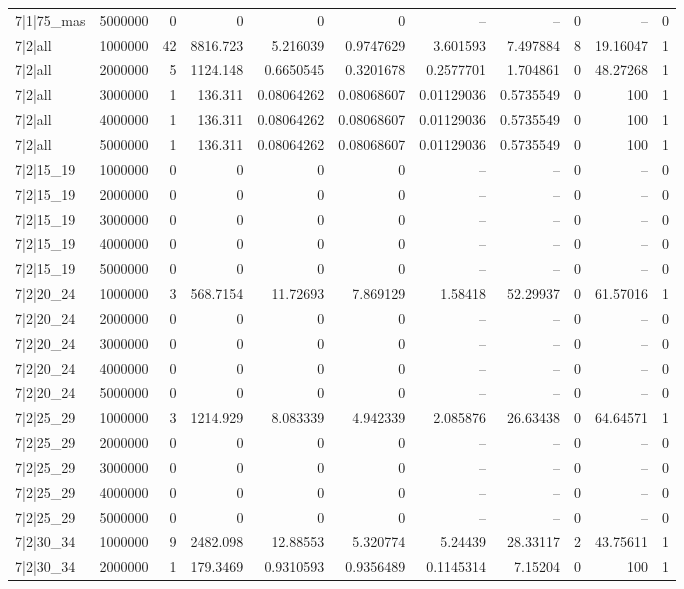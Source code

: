 \begin{tabular}{lrrrrrrrrrr}
7|1|75\_mas & 5000000 & 0 & 0 & 0 & 0 & -- & -- & 0 & -- & 0 \\
7|2|all & 1000000 & 42 & 8816.723 & 5.216039 & 0.9747629 & 3.601593 & 7.497884 & 8 & 19.16047 & 1 \\
7|2|all & 2000000 & 5 & 1124.148 & 0.6650545 & 0.3201678 & 0.2577701 & 1.704861 & 0 & 48.27268 & 1 \\
7|2|all & 3000000 & 1 & 136.311 & 0.08064262 & 0.08068607 & 0.01129036 & 0.5735549 & 0 & 100 & 1 \\
7|2|all & 4000000 & 1 & 136.311 & 0.08064262 & 0.08068607 & 0.01129036 & 0.5735549 & 0 & 100 & 1 \\
7|2|all & 5000000 & 1 & 136.311 & 0.08064262 & 0.08068607 & 0.01129036 & 0.5735549 & 0 & 100 & 1 \\
7|2|15\_19 & 1000000 & 0 & 0 & 0 & 0 & -- & -- & 0 & -- & 0 \\
7|2|15\_19 & 2000000 & 0 & 0 & 0 & 0 & -- & -- & 0 & -- & 0 \\
7|2|15\_19 & 3000000 & 0 & 0 & 0 & 0 & -- & -- & 0 & -- & 0 \\
7|2|15\_19 & 4000000 & 0 & 0 & 0 & 0 & -- & -- & 0 & -- & 0 \\
7|2|15\_19 & 5000000 & 0 & 0 & 0 & 0 & -- & -- & 0 & -- & 0 \\
7|2|20\_24 & 1000000 & 3 & 568.7154 & 11.72693 & 7.869129 & 1.58418 & 52.29937 & 0 & 61.57016 & 1 \\
7|2|20\_24 & 2000000 & 0 & 0 & 0 & 0 & -- & -- & 0 & -- & 0 \\
7|2|20\_24 & 3000000 & 0 & 0 & 0 & 0 & -- & -- & 0 & -- & 0 \\
7|2|20\_24 & 4000000 & 0 & 0 & 0 & 0 & -- & -- & 0 & -- & 0 \\
7|2|20\_24 & 5000000 & 0 & 0 & 0 & 0 & -- & -- & 0 & -- & 0 \\
7|2|25\_29 & 1000000 & 3 & 1214.929 & 8.083339 & 4.942339 & 2.085876 & 26.63438 & 0 & 64.64571 & 1 \\
7|2|25\_29 & 2000000 & 0 & 0 & 0 & 0 & -- & -- & 0 & -- & 0 \\
7|2|25\_29 & 3000000 & 0 & 0 & 0 & 0 & -- & -- & 0 & -- & 0 \\
7|2|25\_29 & 4000000 & 0 & 0 & 0 & 0 & -- & -- & 0 & -- & 0 \\
7|2|25\_29 & 5000000 & 0 & 0 & 0 & 0 & -- & -- & 0 & -- & 0 \\
7|2|30\_34 & 1000000 & 9 & 2482.098 & 12.88553 & 5.320774 & 5.24439 & 28.33117 & 2 & 43.75611 & 1 \\
7|2|30\_34 & 2000000 & 1 & 179.3469 & 0.9310593 & 0.9356489 & 0.1145314 & 7.15204 & 0 & 100 & 1 \\

\end{tabular}
